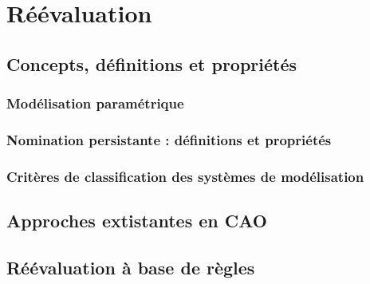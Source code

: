 \section[Réévaluation]{Réévaluation}
\label{sec:etat-art-reevaluation}

\subsection[Concepts, définitions et propriétés]{Concepts, définitions et propriétés}
\label{sec:etat-art-reevaluation-defs-props}

\subsubsection[Modélisation paramétrique]{Modélisation paramétrique}
\label{sec:etat-art-reevaluation-model-param}

\subsubsection[Nomination persistante : définitions et propriétés]{Nomination persistante : définitions et propriétés}
\label{sec:etat-art-reevaluation-model-param-nom-persistant-def-props}

\subsubsection[Critères de classification des systèmes de modélisation]{Critères de classification des systèmes de modélisation}
\label{sec:etat-art-reevaluation-model-param-criteres}

\subsection[Approches existantes en CAO]{Approches extistantes en CAO}
\label{sec:etat-art-reevaluation-approches}

\subsection[Réévaluation à base de règles]{Réévaluation à base de règles}
\label{sec:etat-art-reevaluation-reevaluation-regles}

